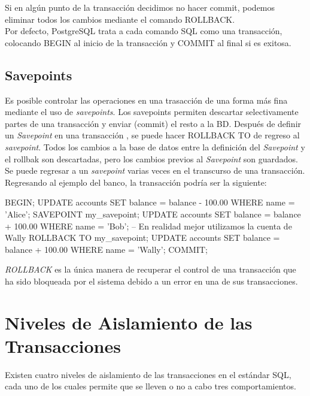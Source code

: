 Si en algún punto de la transacción decidimos no hacer commit, podemos eliminar todos los cambios mediante el comando ROLLBACK.\\

Por defecto, PostgreSQL trata a cada comando SQL como una transacción, colocando BEGIN al inicio de la transacción y  COMMIT al final si es exitosa.\\

\subsection{Savepoints}

Es posible controlar las operaciones en una trasacción de una forma más fina mediante el uso de \textit{savepoints}. Los savepoints permiten descartar selectivamente partes de una transacción y enviar (commit) el resto a la BD. Después de definir un \textit{Savepoint} en una transacción , se puede hacer ROLLBACK TO de regreso al \textit{savepoint}. Todos los cambios a la base de datos entre la definición del \textit{Savepoint} y el rollbak son descartadas, pero los cambios previos al \textit{Savepoint} son guardados.\\

Se puede regresar a un \textit{savepoint} varias veces en el transcurso de una transacción.\\

Regresando al ejemplo del banco, la transacción podría ser la siguiente:\\

\begin{pyglist}
BEGIN;
UPDATE accounts SET balance = balance - 100.00
WHERE name = 'Alice';
SAVEPOINT my_savepoint;
UPDATE accounts SET balance = balance + 100.00
WHERE name = 'Bob';
-- En realidad mejor utilizamos la cuenta de Wally
ROLLBACK TO my_savepoint;
UPDATE accounts SET balance = balance + 100.00
WHERE name = 'Wally';
COMMIT;
\end{pyglist}

\textit{ROLLBACK} es la única manera de recuperar el control de una transacción que ha sido bloqueada por el sistema debido a un error en una de sus transacciones.

\section{Niveles de Aislamiento de las Transacciones}

Existen cuatro niveles de aislamiento de las transacciones en el estándar SQL, cada uno de los cuales permite que se lleven o no a cabo tres comportamientos.\\

